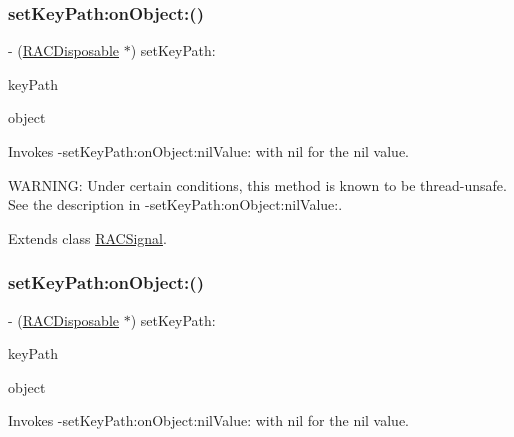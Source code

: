 \subsubsection{\texorpdfstring{set\+Key\+Path\+:on\+Object\+:()}{setKeyPath:onObject:()}\hspace{0.1cm}{\footnotesize\ttfamily [1/3]}}
{\footnotesize\ttfamily -\/ (\mbox{\hyperlink{interface_r_a_c_disposable}{R\+A\+C\+Disposable}} $\ast$) set\+Key\+Path\+: \begin{DoxyParamCaption}\item[{(N\+S\+String $\ast$)}]{key\+Path }\item[{onObject:(N\+S\+Object $\ast$)}]{object }\end{DoxyParamCaption}}

Invokes -\/set\+Key\+Path\+:on\+Object\+:nil\+Value\+: with {\ttfamily nil} for the nil value.

W\+A\+R\+N\+I\+NG\+: Under certain conditions, this method is known to be thread-\/unsafe. See the description in -\/set\+Key\+Path\+:on\+Object\+:nil\+Value\+:. 

Extends class \mbox{\hyperlink{interface_r_a_c_signal_ada2a2f51a30fb8bef13819c50ebfbf85}{R\+A\+C\+Signal}}.

\mbox{\label{category_r_a_c_signal_07_operations_08_ada2a2f51a30fb8bef13819c50ebfbf85}} 
\subsubsection{\texorpdfstring{set\+Key\+Path\+:on\+Object\+:()}{setKeyPath:onObject:()}\hspace{0.1cm}{\footnotesize\ttfamily [2/3]}}
{\footnotesize\ttfamily -\/ (\mbox{\hyperlink{interface_r_a_c_disposable}{R\+A\+C\+Disposable}} $\ast$) set\+Key\+Path\+: \begin{DoxyParamCaption}\item[{(N\+S\+String $\ast$)}]{key\+Path }\item[{onObject:(N\+S\+Object $\ast$)}]{object }\end{DoxyParamCaption}}

Invokes -\/set\+Key\+Path\+:on\+Object\+:nil\+Value\+: with {\ttfamily nil} for the nil value.

